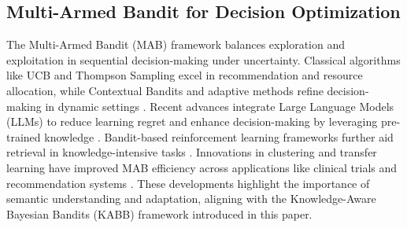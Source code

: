
\subsection{Multi-Armed Bandit for Decision Optimization}

The Multi-Armed Bandit (MAB) framework balances exploration and exploitation in sequential decision-making under uncertainty. Classical algorithms like UCB and Thompson Sampling excel in recommendation and resource allocation, while Contextual Bandits and adaptive methods refine decision-making in dynamic settings \cite{li2010contextual}. Recent advances integrate Large Language Models (LLMs) to reduce learning regret and enhance decision-making by leveraging pre-trained knowledge \cite{alamdari2024jump}. Bandit-based reinforcement learning frameworks further aid retrieval in knowledge-intensive tasks \cite{tang2024mba}. Innovations in clustering and transfer learning have improved MAB efficiency across applications like clinical trials and recommendation systems \cite{qi2025graphfeedbackbanditssimilar,sharma2025offlinetoonlinehyperparametertransferstochastic}. These developments highlight the importance of semantic understanding and adaptation, aligning with the Knowledge-Aware Bayesian Bandits (KABB) framework introduced in this paper.



